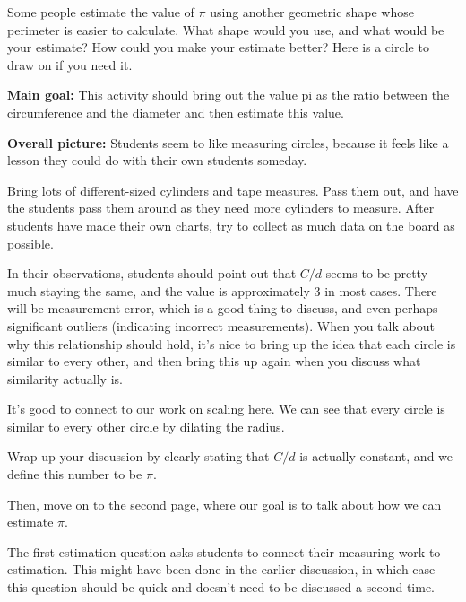 \documentclass[noauthor, nooutcomes, handout]{ximera}
\begin{document}
\begin{problem}
Some people estimate the value of $\pi$ using another geometric shape whose perimeter is easier to calculate. What shape would you use, and what would be your estimate? How could you make your estimate better? Here is a circle to draw on if you need it.
\begin{image} \end{image}
\end{problem}

\newpage





\begin{instructorNotes}
{\bf Main goal:} This activity should bring out the value pi as the ratio between the circumference and the diameter and then estimate this value.  


{\bf Overall picture:} Students seem to like measuring circles, because it feels like a lesson they could do with their own students someday.

Bring lots of different-sized cylinders and tape measures.  Pass them out, and have the students pass them around as they need more cylinders to measure.  After students have made their own charts, try to collect as much data on the board as possible.

In their observations, students should point out that $C/d$ seems to be pretty much staying the same, and the value is approximately 3 in most cases.  There will be measurement error, which is a good thing to discuss, and even perhaps significant outliers (indicating incorrect measurements).  When you talk about why this relationship should hold, it's nice to bring up the idea that each circle is similar to every other, and then bring this up again when you discuss what similarity actually is.

It's good to connect to our work on scaling here. We can see that every circle is similar to every other circle by dilating the radius.

Wrap up your discussion by clearly stating that $C/d$ is actually constant, and we define this number to be $\pi$.

Then, move on to the second page, where our goal is to talk about how we can estimate $\pi$. 

The first estimation question asks students to connect their measuring work to estimation. This might have been done in the earlier discussion, in which case this question should be quick and doesn't need to be discussed a second time. 


\end{instructorNotes}
\end{document}
